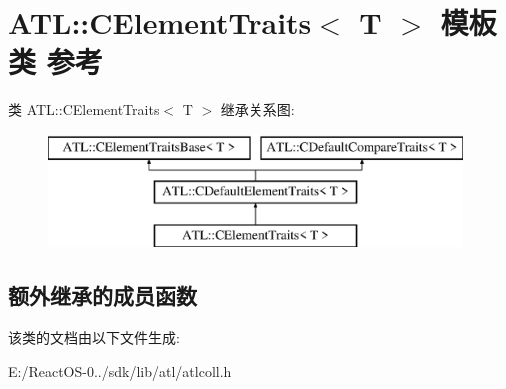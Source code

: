 \hypertarget{class_a_t_l_1_1_c_element_traits}{}\section{A\+TL\+:\+:C\+Element\+Traits$<$ T $>$ 模板类 参考}
\label{class_a_t_l_1_1_c_element_traits}
类 A\+TL\+:\+:C\+Element\+Traits$<$ T $>$ 继承关系图\+:\begin{figure}[H]
\begin{center}
\leavevmode
\includegraphics[height=3.000000cm]{class_a_t_l_1_1_c_element_traits}
\end{center}
\end{figure}
\subsection*{额外继承的成员函数}


该类的文档由以下文件生成\+:\begin{DoxyCompactItemize}
\item 
E\+:/\+React\+O\+S-\/0../sdk/lib/atl/atlcoll.\+h\end{DoxyCompactItemize}
